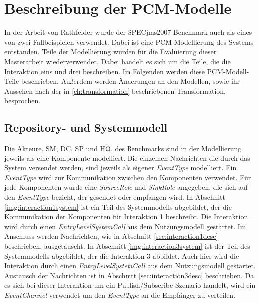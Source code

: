 \section{Beschreibung der PCM-Modelle}
\label{sec:specjmsmodell}
In der Arbeit von Rathfelder \cite{Rathfelder2013} wurde der SPECjms2007-Benchmark auch als eines von zwei Fallbeispielen verwendet. Dabei ist eine PCM-Modellierung des Systems entstanden. Teile der Modellierung wurden für die Evaluierung dieser Masterarbeit wiederverwendet. Dabei handelt es sich um die Teile, die die Interaktion eins und drei beschreiben. Im Folgenden werden diese PCM-Modell-Teile beschrieben. Außerdem werden Änderungen an den Modellen, sowie ihr Aussehen nach der in \autoref{ch:transformation} beschriebenen Transformation, besprochen. 

\subsection{Repository- und Systemmodell}
Die Akteure, SM, DC, SP und HQ, des Benchmarks sind in der Modellierung jeweils als eine Komponente modelliert. Die einzelnen Nachrichten die durch das System versendet werden, sind jeweils als eigener \emph{EventType} modelliert. Ein \emph{EventType} wird zur Kommunikation zwischen den Komponenten verwendet. Für jede Komponenten wurde eine \emph{SourceRole} und \emph{SinkRole} angegeben, die sich auf den \emph{EventType} bezieht, der gesendet oder empfangen wird. In Abschnitt \ref{img:interaction1system} ist ein Teil des Systemmodells abgebildet, der die Kommunikation der Komponenten für Interaktion 1 beschreibt. Die Interaktion wird durch einen \emph{EntryLevelSystemCall} aus dem Nutzungsmodell gestartet. Im Anschluss werden Nachrichten, wie in Abschnitt \ref{sec:interaction1desc} beschrieben, ausgetauscht. In Abschnitt \ref{img:interaction3system} ist der Teil des Systemmodells abgebildet, der die Interaktion 3 abbildet. Auch hier wird die Interaktion durch einen \emph{EntryLevelSystemCall} aus dem Nutzungsmodell gestartet. Austausch der Nachrichten ist in Abschnitt \ref{sec:interaction3desc} beschrieben. Da es sich bei dieser Interaktion um ein Publish/Subscribe Szenario handelt, wird ein \emph{EventChannel} verwendet um den \emph{EventType} an die Empfänger zu verteilen.

